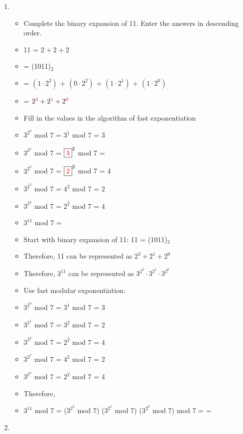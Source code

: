 \documentclass[12pt,a4paper]{article}
\begin{document}
\begin{enumerate}
  \clearpage
  \item {}
  \begin{itemize}
    \item Complete the binary expansion of 11. Enter the answers in descending order.
    \item[] 11 = \(2^{\boxed{}} + 2^{\boxed{}} + 2^{\boxed{}}\) 
    \item[] = (1011)\(_{2}\)
    \item[] = \((1 \cdot 2^3)\) + \((0 \cdot 2^2)\) + \((1 \cdot 2^1)\) + \((1 \cdot 2^0)\)  
    \item[] = \(2^{\textcolor{red}{3}} + 2^{\textcolor{red}{1}} + 2^{\textcolor{red}{0}}\) 
    \item Fill in the values in the algorithm of fast exponentiation
    \item[] \(3^{2^{0}}\) mod 7 = \(3^1\) mod 7 = 3
    \item[] \(3^{2^{1}}\) mod 7 = \(\boxed{\textcolor{red}{3}}^{2}\) mod 7 =  
    \item[] \(3^{2^{2}}\) mod 7 = \(\boxed{\textcolor{red}{2}}^{2}\) mod 7 = 4
    \item[] \(3^{2^{3}}\) mod 7 = \(4^2\) mod 7 = 2
    \item[] \(3^{2^{4}}\) mod 7 = \(2^2\) mod 7 = 4   
    \item \(3^{11}\) mod 7 = 
    \item[] Start with binary expansion of 11: 11 = (1011)\(_2\) 
    \item[] Therefore, 11 can be represented as \(2^3 + 2^1 + 2^0\)
    \item[] Therefore, \(3^{11}\) can be represented as \(3^{2^{3}} \cdot 3^{2^{1}} \cdot 3^{2^{0}}\)  
    \item[] Use fast modular exponentiation:
    \item[] \(3^{2^{0}}\) mod 7 = \(3^1\) mod 7 = 3
    \item[] \(3^{2^{1}}\) mod 7 = \(3^2\) mod 7 = 2
    \item[] \(3^{2^{2}}\) mod 7 = \(2^2\) mod 7 = 4
    \item[] \(3^{2^{3}}\) mod 7 = \(4^2\) mod 7 = 2 
    \item[] \(3^{2^{4}}\) mod 7 = \(2^2\) mod 7 = 4 
    \item[] Therefore,
    \item[] \(3^{11}\) mod 7 = (\(3^{2^{3}}\) mod 7) (\(3^{2^{1}}\) mod 7) (\(3^{2^{0}}\) mod 7) mod 7 =  = 
  \end{itemize}
  \item {}

\end{enumerate}
\end{document}
